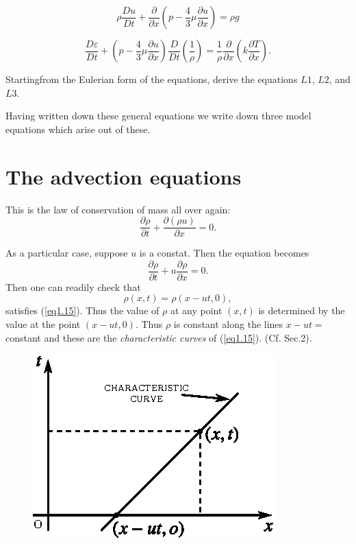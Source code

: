 \medskip
{}
\begin{equation*}
\rho \dfrac{Du}{Dt} + \dfrac{\partial}{\partial x} \left(p-\frac{4}{3}
\mu \frac{\partial u}{\partial x}\right) = \rho g \tag{1.13}\label{eq1.13}
\end{equation*}

\medskip
{}
\begin{equation*}
\frac{D\varepsilon}{Dt} + \left(p-\frac{4}{3} \mu \frac{\partial
  u}{\partial x}\right) \frac{D}{Dt} \left(\frac{1}{\rho}\right) =
\frac{1}{\rho} 
\frac{\partial }{\partial x} \left(k \frac{\partial T}{\partial
  x}\right). \tag{1.14}\label{eq1.14} 
\end{equation*}

\begin{exercise}\label{chap1:exer1.2}
Starting\pageoriginale from the Eulerian form of the equations, derive
the equations $L1$, $L2$, and $L3$.
\end{exercise}

Having written down these general equations we write down three model
equations which arise out of these. 

\section{The advection equations}\label{chap1:sec1.6}

This is the law of conservation of mass all over again:
$$
\frac{\partial \rho}{\partial t} + \frac{\partial (\rho
  u)}{\partial x} = 0.
$$

As a particular case, suppose $u$ is a constat. Then the equation
becomes
\begin{equation*}
\frac{\partial \rho}{\partial t} + u \frac{\partial \rho}{\partial
  x} =0 . \tag{1.15}\label{eq1.15}
\end{equation*}
Then one can readily check that
\begin{equation*}
\rho (x,t) = \rho (x-ut, 0),\tag{1.16}\label{eq1.16}
\end{equation*}
satisfies (\ref{eq1.15}). Thus the value of $\rho$ at any point $(x,t)$ is
determined by the value at the point $(x - ut, 0)$. Thus $\rho$ is
constant along the lines $x - ut =$ constant and these are the {\em
  characteristic curves} of (\ref{eq1.15}). (Cf. Sec.2).
\begin{figure}[H]
\centering
\includegraphics{figures/fig52-1.1.eps}
\caption{}\label{c1:fig1.1}
\end{figure}

